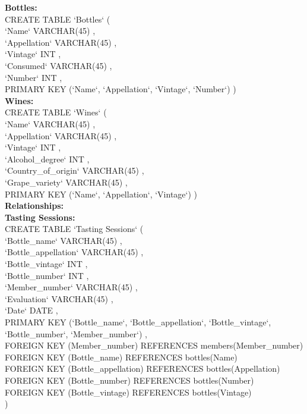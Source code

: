 \documentclass{article}
\theoremstyle{remark}
\numberwithin{equation}{section}
\begin{document}
	  \textbf{Bottles: }\\
	  
	  CREATE  TABLE `Bottles` (\\
	  `Name` VARCHAR(45)  ,\\
	  `Appellation` VARCHAR(45)  ,\\
	  `Vintage` INT  ,\\
	  `Consumed` VARCHAR(45)  ,\\
	  `Number` INT ,\\
	  PRIMARY KEY (`Name`, `Appellation`, `Vintage`, `Number`) )\\
	  
	 \textbf{ Wines:}\\
	  CREATE  TABLE `Wines` (\\
	  `Name` VARCHAR(45) ,\\
	  `Appellation` VARCHAR(45)  ,\\
	  `Vintage` INT  ,\\
	  `Alcohol\_degree` INT  ,\\
	  `Country\_of\_origin` VARCHAR(45)  ,\\
	  `Grape\_variety` VARCHAR(45) ,\\
	  PRIMARY KEY (`Name`, `Appellation`, `Vintage`) )\\
	  
	  
	  \textbf{Relationships:}\\
	  \textbf{Tasting Sessions:} \\
	  CREATE  TABLE `Tasting Sessions` (\\
	  `Bottle\_name` VARCHAR(45)  ,\\
	  `Bottle\_appellation` VARCHAR(45)  ,\\
	  `Bottle\_vintage` INT  ,\\
	  `Bottle\_number` INT  ,\\
	  `Member\_number` VARCHAR(45)  ,\\
	  `Evaluation` VARCHAR(45) ,\\
	  `Date` DATE  ,\\
	  PRIMARY KEY (`Bottle\_name`, `Bottle\_appellation`, `Bottle\_vintage`, `Bottle\_number`, `Member\_number`) ,\\
	  FOREIGN KEY (Member\_number) REFERENCES members(Member\_number)\\
	  FOREIGN KEY (Bottle\_name) REFERENCES bottles(Name)\\	  
	  FOREIGN KEY (Bottle\_appellation) REFERENCES bottles(Appellation)\\
	  FOREIGN KEY (Bottle\_number) REFERENCES bottles(Number)\\
	  FOREIGN KEY (Bottle\_vintage) REFERENCES bottles(Vintage)\\
	  )\\
	  
\end{document}
